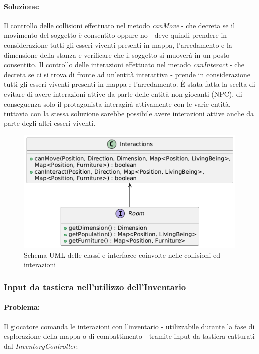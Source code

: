 \documentclass[a4paper,12pt]{report}
\begin{document}
\paragraph{Soluzione:} Il controllo delle collisioni effettuato nel metodo \textit{canMove} - che decreta se il movimento del soggetto è consentito oppure no - deve quindi prendere 
in considerazione tutti gli esseri viventi presenti in mappa, l'arredamento e la dimensione della stanza e verificare che il soggetto si muoverà in un posto consentito.
Il controllo delle interazioni effettuato nel metodo \textit{canInteract} - che decreta se ci si trova di fronte ad un'entità interattiva - prende in 
considerazione tutti gli esseri viventi presenti in mappa e l'arredamento. 
È stata fatta la scelta di evitare di avere interazioni attive da parte delle entità non giocanti (NPC), di conseguenza solo il protagonista interagirà
attivamente con le varie entità, tuttavia con la stessa soluzione sarebbe possibile avere interazioni attive anche da parte degli altri esseri viventi.
\begin{figure}[H]
	\centering{}
	\includegraphics[width=\textwidth]{img/lorenzo/interactions.png}
	\caption{Schema UML delle classi e interfacce coinvolte nelle collisioni ed interazioni}
	\label{img:template}
\end{figure}

\subsubsection{Input da tastiera nell'utilizzo dell'Inventario}
\paragraph{Problema:} Il giocatore comanda le interazioni con l'inventario - utilizzabile durante la fase di esplorazione della mappa o di combattimento - tramite input da tastiera
catturati dal \textit{InventoryController}.
\end{document}

